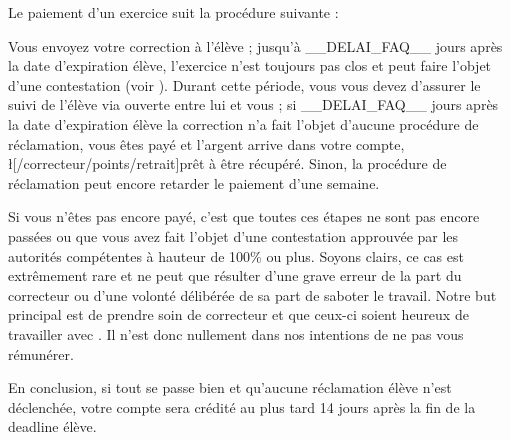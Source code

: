 ﻿Le paiement d'un exercice suit la procédure suivante :

\begin{itemize}
	\li Vous envoyez votre correction à l'élève ;
	\li jusqu'à __DELAI_FAQ__ jours après la date d'expiration élève, l'exercice n'est toujours pas clos et peut faire l'objet d'une contestation (voir ). Durant cette période, vous vous devez d'assurer le suivi de l'élève via  ouverte entre lui et vous ;
	\li si __DELAI_FAQ__ jours après la date d'expiration élève la correction n'a fait l'objet d'aucune procédure de réclamation, vous êtes payé et l'argent arrive dans votre compte, \l[/correcteur/points/retrait]{prêt à être récupéré}. Sinon, la procédure de réclamation peut encore retarder le paiement d'une semaine.
\end{itemize}

Si vous n'êtes pas encore payé, c'est que toutes ces étapes ne sont pas encore passées ou que vous avez fait l'objet d'une contestation approuvée par les autorités compétentes à hauteur de 100\% ou plus. Soyons clairs, ce cas est extrêmement rare et ne peut que résulter d'une grave erreur de la part du correcteur ou d'une volonté délibérée de sa part de saboter le travail. Notre but principal est de prendre soin de correcteur et que ceux-ci soient heureux de travailler avec \eDevoir. Il n'est donc nullement dans nos intentions de ne pas vous rémunérer.

En conclusion, si tout se passe bien et qu'aucune réclamation élève n'est déclenchée, votre compte \eDevoir sera crédité au plus tard 14 jours après la fin de la deadline élève.